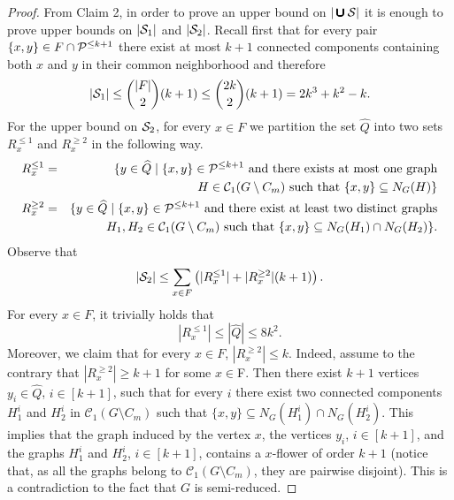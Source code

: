 \documentclass[a4paper,11pt]{article}
\newcommand{\cc}{{\mathcal{C}}}
\newcommand{\cupall}{\pmb{\pmb{\cup}}}
\begin{document}
\begin{proof}
\noindent From Claim 2, in order to prove an upper bound on $|\cupall {\cal S}|$ it is enough to prove upper bounds on $|{\cal S}_{1}|$ and $|{\cal S}_{2}|$.
Recall first that for every pair $\{x,y\}\in F\cap {\cal P}^{\leq k+1}$ there exist at most $k+1$ connected components containing both $x$ and $y$ in their
common neighborhood and therefore 
\begin{equation}\label{aefalwefnlkflwa}
\displaystyle |{\cal S}_{1}|\leq \binom{|F|}{2}(k+1)\leq \binom{2k}{2}(k+1)=2k^{3}+k^{2}-k.
\end{equation}
\noindent For the upper bound on ${\cal S}_{2}$, for every $x\in F$ we partition the set $\widehat{Q}$
into two sets $R_{x}^{\leq 1}$ and $R_{x}^{\geq 2}$ in the following way.
\begin{eqnarray*}
R_{x}^{\leq 1} & = & \{y\in \widehat{Q}\mid \{x,y\}\in {\cal P}^{\leq k+1} \text{ and there exists at most one graph}\nonumber \\
& &  H\in \cc_{1}(G\setminus C_{m}) \text{ such that } \{x,y\}\subseteq N_{G}(H)\}\\
R_{x}^{\geq 2} & = & \{y\in \widehat{Q}\mid \{x,y\}\in {\cal P}^{\leq k+1} \text{ and there exist at least two distinct graphs}\nonumber \\
& & H_{1},H_{2}\in \cc_{1}(G\setminus C_{m}) \text{ such that } \{x,y\}\subseteq N_{G}(H_{1})\cap N_{G}(H_{2})\}.
\end{eqnarray*}
Observe that 
\begin{equation}\label{eqnealwefaw}
|{\cal S}_{2}|\leq \sum_{x\in F} \left(|R_{x}^{\leq 1}| + |R_{x}^{\geq 2}|(k+1)\right).
\end{equation} 
For every $x\in F$, it trivially holds that 
\begin{equation}\label{regaliuhgawel}
|R_{x}^{\leq 1}|\leq |\widehat{Q}|\leq 8k^{2}.
\end{equation}
Moreover, we claim that for every $x\in F$, $|R_{x}^{\geq 2}|\leq k$. Indeed, assume to the contrary that $|R_{x}^{\geq 2}|\geq k+1$ for some $x\in $F.
Then there exist $k+1$ vertices $y_{i}\in \widehat{Q}$, $i\in [k+1]$, such that
for every $i$ there exist two connected components $H_{1}^{i}$ and $H_{2}^{i}$ in $\cc_{1}(G\setminus C_{m})$ such that 
$\{x,y\}\subseteq N_{G}(H_{1}^{i})\cap N_{G}(H_{2}^{i})$. This implies that the graph induced by the vertex $x$, the vertices $y_{i}$, $i\in [k+1]$, and the
graphs $H_{1}^{i}$ and $H_{2}^{i}$, $i\in [k+1]$, contains a $x$-flower of order $k+1$ (notice that, as all the graphs belong to $\cc_{1}(G\setminus C_{m})$, 
they are pairwise disjoint). This is a contradiction to the fact that $G$ is semi-reduced.

\end{proof}
\end{document}
